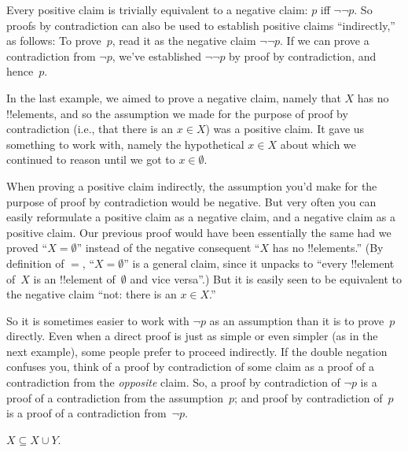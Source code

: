\documentclass[../../../include/open-logic-section]{subfiles}
\begin{document}
Every positive claim is trivially equivalent to a negative claim: $p$
iff $\lnot\lnot p$.  So proofs by contradiction can also be used to
establish positive claims ``indirectly,'' as follows: To prove~$p$,
read it as the negative claim $\lnot\lnot p$. If we can prove a
contradiction from $\lnot p$, we've established $\lnot\lnot p$ by
proof by contradiction, and hence~$p$.

In the last example, we aimed to prove a negative claim, namely that
$X$ has no !!{element}s, and so the assumption we made for the purpose
of proof by contradiction (i.e., that there is an $x \in X$) was a
positive claim. It gave us something to work with, namely the
hypothetical $x \in X$ about which we continued to reason until we got
to $x \in \emptyset$.

When proving a positive claim indirectly, the assumption you'd make
for the purpose of proof by contradiction would be negative. But very
often you can easily reformulate a positive claim as a negative claim,
and a negative claim as a positive claim.  Our previous proof would
have been essentially the same had we proved ``$X = \emptyset$''
instead of the negative consequent ``$X$ has no !!{element}s.'' (By
definition of $=$, ``$X = \emptyset$'' is a general claim, since it
unpacks to ``every !!{element} of~$X$ is an !!{element} of~$\emptyset$
and vice versa''.) But it is easily seen to be equivalent to the
negative claim ``not: there is an $x \in X$.''

So it is sometimes easier to work with $\lnot p$ as an assumption than
it is to prove~$p$ directly.  Even when a direct proof is just as
simple or even simpler (as in the next example), some people prefer to
proceed indirectly.  If the double negation confuses you, think of a
proof by contradiction of some claim as a proof of a contradiction
from the \emph{opposite} claim. So, a proof by contradiction of $\lnot
p$ is a proof of a contradiction from the assumption~$p$; and proof by
contradiction of~$p$ is a proof of a contradiction from~$\lnot p$.

\begin{prop}
$X \subseteq X \cup Y$.
\end{prop}
\end{document}
